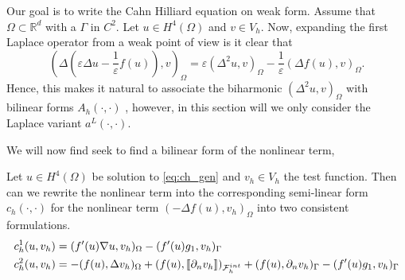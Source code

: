 Our goal is to write the Cahn Hilliard equation on weak form.
Assume that $\Omega  \subset \mathbb{R} ^{d}$ with a $\Gamma $ in $C^2$.
 Let $u \in  H^{4}( \Omega ) $ and $v \in V_{h} $.
Now, expanding the first Laplace operator from a weak point of view is it clear that
\[
 ( \Delta ( \varepsilon  \Delta u - \frac{1}{\varepsilon } f( u) ) ,v )_{\Omega } = \varepsilon ( \Delta^{2} u ,v )_{\Omega } - \frac{1}{\varepsilon } ( \Delta f( u)  ,v )_{\Omega }.
\]
Hence, this makes it natural to associate the biharmonic $( \Delta ^2 u,v)_{\Omega } $ with bilinear forms $A_{h}( \cdot ,\cdot ) $ , however, in this section will we only consider the Laplace
variant $a^{L}( \cdot ,\cdot ) $.

We will now find seek to find a bilinear form of the nonlinear term,
\begin{lemma}
    Let $u \in H^4( \Omega ) $ be solution to \eqref{eq:ch_gen} and $v_{h} \in V_{h}$ the test function.
Then can we rewrite the nonlinear term into the corresponding semi-linear form $c_{h}( \cdot ,\cdot )  $ for the nonlinear term $( -\Delta f( u) , v_{h})_{\Omega }$ into two consistent formulations.
\begin{align}
    \label{eq:ch:1}
      c^{1}_{h} ( u,v_{h})  & = ( f' ( u) \nabla u, v_{h} )_{\Omega }  - ( f'( u)  g_{1}   ,  v_{h})_{\Gamma } \\
    \label{eq:ch:2}
        c^{2}_{h} ( u,v_{h})  & = -( f( u), \Delta v_{h} )_{\Omega }+  ( f( u) , \left[\!\left[  \partial _{n}v_{h}  \right]\!\right]  )_{\mathcal{F} _{h}^{int}} + ( f(u), \partial _{n} v_{h})_{\Gamma  }  - ( f'( u)  g_{1}   ,  v_{h})_{\Gamma }
\end{align}

\end{lemma}

